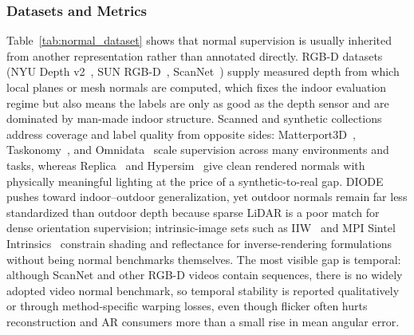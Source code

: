 \subsubsection{Datasets and Metrics}
\label{sec:normal_performance}

Table~\ref{tab:normal_dataset} shows that normal supervision is usually inherited from another representation rather than annotated directly.
RGB-D datasets (NYU Depth v2~\cite{silberman2012nyudv2}, SUN RGB-D~\cite{song2015sunrgbd}, ScanNet~\cite{dai2017scannet}) supply measured depth from which local planes or mesh normals are computed, which fixes the indoor evaluation regime but also means the labels are only as good as the depth sensor and are dominated by man-made indoor structure.
Scanned and synthetic collections address coverage and label quality from opposite sides: Matterport3D~\cite{chang2017matterport3d}, Taskonomy~\cite{zamir2018taskonomy}, and Omnidata~\cite{eftekhar2021omnidata} scale supervision across many environments and tasks, whereas Replica~\cite{straub2019replica} and Hypersim~\cite{roberts2021hypersim} give clean rendered normals with physically meaningful lighting at the price of a synthetic-to-real gap.
DIODE~\cite{vasiljevic2019diode} pushes toward indoor--outdoor generalization, yet outdoor normals remain far less standardized than outdoor depth because sparse LiDAR is a poor match for dense orientation supervision; intrinsic-image sets such as IIW~\cite{bell2014intrinsic} and MPI Sintel Intrinsics~\cite{chen2013simple} constrain shading and reflectance for inverse-rendering formulations without being normal benchmarks themselves.
The most visible gap is temporal: although ScanNet and other RGB-D videos contain sequences, there is no widely adopted video normal benchmark, so temporal stability is reported qualitatively or through method-specific warping losses, even though flicker often hurts reconstruction and AR consumers more than a small rise in mean angular error.




